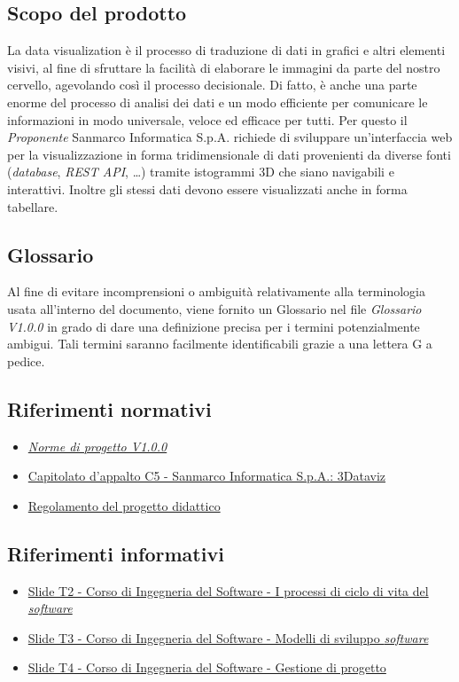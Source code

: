     \subsection{Scopo del prodotto}
    La data visualization è il processo di traduzione di dati in grafici e altri elementi visivi,
    al fine di sfruttare la facilità di elaborare le immagini da parte del nostro cervello,
    agevolando così il processo decisionale.
    Di fatto, è anche una parte enorme del processo di analisi dei dati e un modo efficiente per
    comunicare le informazioni in modo universale, veloce ed efficace per tutti.
    Per questo il \textit{Proponente} Sanmarco Informatica S.p.A. richiede di sviluppare un'interfaccia web 
    per la visualizzazione in forma tridimensionale di dati provenienti da diverse fonti (\textit{database},
    \textit{REST API}, \dots) tramite istogrammi 3D che siano navigabili e interattivi. Inoltre 
    gli stessi dati devono essere visualizzati anche in forma tabellare. 
    \subsection{Glossario}
    Al fine di evitare incomprensioni o ambiguità relativamente alla terminologia usata 
    all'interno del documento, viene fornito un Glossario nel file \textit{Glossario V1.0.0} 
    in grado di dare una definizione precisa per i termini potenzialmente ambigui. 
    Tali termini saranno facilmente identificabili grazie a una lettera G a pedice.
    \subsection{Riferimenti normativi}
    \begin{itemize}
        \item \href{URL}{\textit{Norme di progetto V1.0.0}}
        \item \href{https://www.math.unipd.it/~tullio/IS-1/2024/Progetto/C5.pdf}
        {Capitolato d'appalto C5 - Sanmarco Informatica S.p.A.: 3Dataviz}
        \item \href{https://www.math.unipd.it/~tullio/IS-1/2024/Dispense/PD1.pdf}
            {Regolamento del progetto didattico}
    \end{itemize}
    \subsection{Riferimenti informativi}
    \begin{itemize}
        \item \href{https://www.math.unipd.it/~tullio/IS-1/2024/Dispense/T02.pdf}
            {Slide T2 - Corso di Ingegneria del Software - I processi di ciclo di vita del \textit{software}}
        \item \href{https://www.math.unipd.it/~tullio/IS-1/2024/Dispense/T03.pdf}
            {Slide T3 - Corso di Ingegneria del Software - Modelli di sviluppo \textit{software}}
        \item \href{https://www.math.unipd.it/~tullio/IS-1/2024/Dispense/T04.pdf}
            {Slide T4 - Corso di Ingegneria del Software - Gestione di progetto}
    \end{itemize}
